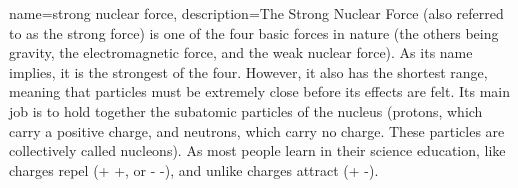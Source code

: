 {
    name=strong nuclear force,
    description={The Strong Nuclear Force (also referred to as the strong force) is one of the four basic forces in nature (the others being gravity, the electromagnetic force, and the weak nuclear force). As its name implies, it is the strongest of the four. However, it also has the shortest range, meaning that particles must be extremely close before its effects are felt. Its main job is to hold together the subatomic particles of the nucleus (protons, which carry a positive charge, and neutrons, which carry no charge. These particles are collectively called nucleons). As most people learn in their science education, like charges repel (+ +, or - -), and unlike charges attract (+ -).}
}
